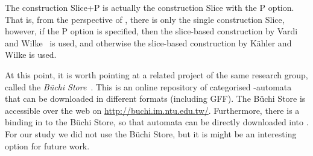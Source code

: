 The construction Slice+P is actually the construction Slice with the P option. That is, from the perspective of \goal, there is only the single construction Slice, however, if the P option is specified, then the slice-based construction by Vardi and Wilke~\cite{vardi2007automata} is used, and otherwise the slice-based construction by Kähler and Wilke \cite{2008_kaehler} is used.





At this point, it is worth pointing at a related project of the same research group, called the \textit{Büchi Store}~\cite{2011_buchi_store}. This is an online repository of categorised \om-automata that can be downloaded in different formats (including GFF). The Büchi Store is accessible over the web on \url{http://buchi.im.ntu.edu.tw/}. Furthermore, there is a binding in \goal{} to the Büchi Store, so that automata can be directly downloaded into \goal. For our study we did not use the Büchi Store, but it is might be an interesting option for future work.


